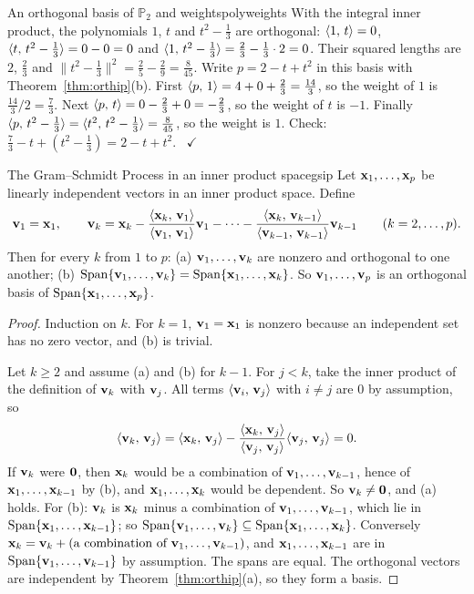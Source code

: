 \documentclass[11pt]{article}
\begin{document}
\begin{exmp}{An orthogonal basis of $\mathbb{P}_2$ and weights}{polyweights}
With the integral inner product, the polynomials $1$, $t$ and $t^2-\tfrac13$ are orthogonal: $\langle 1,\,t\rangle=0$, $\langle t,\,t^2-\tfrac13\rangle=0-0=0$ and $\langle 1,\,t^2-\tfrac13\rangle=\tfrac23-\tfrac13\cdot2=0$. Their squared lengths are $2$, $\tfrac23$ and $\lVert t^2-\tfrac13\rVert^2=\tfrac25-\tfrac29=\tfrac8{45}$. Write $p=2-t+t^2$ in this basis with Theorem~\ref{thm:orthip}(b). First $\langle p,\,1\rangle=4+0+\tfrac23=\tfrac{14}3$, so the weight of $1$ is $\tfrac{14}{3}\big/2=\tfrac73$. Next $\langle p,\,t\rangle=0-\tfrac23+0=-\tfrac23$, so the weight of $t$ is $-1$. Finally $\langle p,\,t^2-\tfrac13\rangle=\langle t^2,\,t^2-\tfrac13\rangle=\tfrac8{45}$, so the weight is $1$. Check: $\tfrac73-t+(t^2-\tfrac13)=2-t+t^2$. \ $\checkmark$
\end{exmp}

\begin{thm}{The Gram--Schmidt Process in an inner product space}{gsip}
Let $\mathbf{x}_1,\dots,\mathbf{x}_p$ be linearly independent vectors in an inner product space. Define
\[
\mathbf{v}_1=\mathbf{x}_1,\qquad \mathbf{v}_k=\mathbf{x}_k-\frac{\langle \mathbf{x}_k,\,\mathbf{v}_1\rangle}{\langle \mathbf{v}_1,\,\mathbf{v}_1\rangle}\mathbf{v}_1-\cdots-\frac{\langle \mathbf{x}_k,\,\mathbf{v}_{k-1}\rangle}{\langle \mathbf{v}_{k-1},\,\mathbf{v}_{k-1}\rangle}\mathbf{v}_{k-1}\qquad(k=2,\dots,p).
\]
Then for every $k$ from $1$ to $p$: (a) $\mathbf{v}_1,\dots,\mathbf{v}_k$ are nonzero and orthogonal to one another; (b) $\operatorname{Span}\{\mathbf{v}_1,\dots,\mathbf{v}_k\}=\operatorname{Span}\{\mathbf{x}_1,\dots,\mathbf{x}_k\}$. So $\mathbf{v}_1,\dots,\mathbf{v}_p$ is an orthogonal basis of $\operatorname{Span}\{\mathbf{x}_1,\dots,\mathbf{x}_p\}$.
\end{thm}

\begin{proof}
Induction on $k$. For $k=1$, $\mathbf{v}_1=\mathbf{x}_1$ is nonzero because an independent set has no zero vector, and (b) is trivial.

Let $k\ge2$ and assume (a) and (b) for $k-1$. For $j<k$, take the inner product of the definition of $\mathbf{v}_k$ with $\mathbf{v}_j$. All terms $\langle \mathbf{v}_i,\,\mathbf{v}_j\rangle$ with $i\neq j$ are $0$ by assumption, so
\[
\langle \mathbf{v}_k,\,\mathbf{v}_j\rangle=\langle \mathbf{x}_k,\,\mathbf{v}_j\rangle-\frac{\langle \mathbf{x}_k,\,\mathbf{v}_j\rangle}{\langle \mathbf{v}_j,\,\mathbf{v}_j\rangle}\langle \mathbf{v}_j,\,\mathbf{v}_j\rangle=0 .
\]
If $\mathbf{v}_k$ were $\mathbf{0}$, then $\mathbf{x}_k$ would be a combination of $\mathbf{v}_1,\dots,\mathbf{v}_{k-1}$, hence of $\mathbf{x}_1,\dots,\mathbf{x}_{k-1}$ by (b), and $\mathbf{x}_1,\dots,\mathbf{x}_k$ would be dependent. So $\mathbf{v}_k\neq\mathbf{0}$, and (a) holds. For (b): $\mathbf{v}_k$ is $\mathbf{x}_k$ minus a combination of $\mathbf{v}_1,\dots,\mathbf{v}_{k-1}$, which lie in $\operatorname{Span}\{\mathbf{x}_1,\dots,\mathbf{x}_{k-1}\}$; so $\operatorname{Span}\{\mathbf{v}_1,\dots,\mathbf{v}_k\}\subseteq\operatorname{Span}\{\mathbf{x}_1,\dots,\mathbf{x}_k\}$. Conversely $\mathbf{x}_k=\mathbf{v}_k+(\text{a combination of }\mathbf{v}_1,\dots,\mathbf{v}_{k-1})$, and $\mathbf{x}_1,\dots,\mathbf{x}_{k-1}$ are in $\operatorname{Span}\{\mathbf{v}_1,\dots,\mathbf{v}_{k-1}\}$ by assumption. The spans are equal. The orthogonal vectors are independent by Theorem~\ref{thm:orthip}(a), so they form a basis.
\end{proof}
\end{document}
